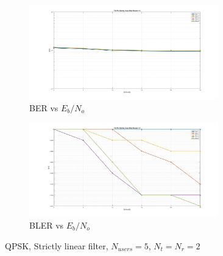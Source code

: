 \documentclass[12pt,a4paper,notitlepage,twoside,headsepline]{scrartcl}
\begin{document}
\begin{figure}
\centering
\begin{subfigure}{.5\textwidth}
  \centering
  \includegraphics[width=0.9\textwidth]{figures/sl_nu5_ber}
  \caption{BER vs $E_b/N_o$} 
  \label{fig:example}
\end{subfigure}%
\begin{subfigure}{.5\textwidth}
  \centering
  \includegraphics[width=0.9\textwidth]{figures/sl_nu5_bler}
  \caption{BLER vs $E_b/N_o$}
  \label{fig:example}
\end{subfigure}
\caption{QPSK, Strictly linear filter, $N_{users} = 5$, $N_t = N_r = 2$}
\label{fig:test}
\end{figure}

\end{document}
